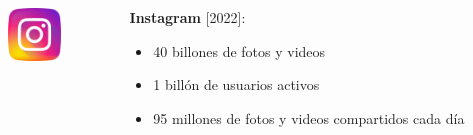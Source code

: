 \begin{frame}
\begin{columns}[T]
\begin{column}{.48\textwidth}
        \end{column}


      


    \end{columns}

    \vspace{20pt}

    \begin{columns}[T]


        \begin{column}{.48\textwidth}

            \begin{columns}[T] %
                \begin{column}{0.20\textwidth}
                    \includegraphics[width=1.4cm]{img/instagram.png}
                \end{column}
                \begin{column}{0.78\textwidth}
                    \large \textbf{Instagram} [2022]:
                    \begin{itemize}
                        \item \small 40 billones de fotos y videos
                        \item  \small 1 bill\'on de usuarios activos
                        \item \small 95 millones de fotos y videos compartidos cada d\'ia
                    \end{itemize}
                \end{column}
            \end{columns}

        \end{column}


\end{columns}
\end{frame}

